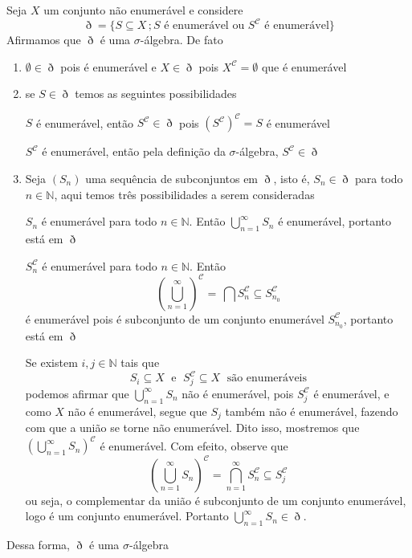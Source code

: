 \documentclass[a4paper, 11pt]{book}
\theoremstyle{definition}
\newcommand{\bN}{\mathbb{N}}
\newcommand{\cC}{\mathcal{C}}
\begin{document}
\begin{ex}
    Seja $X$ um conjunto não enumerável e considere
    \[
        \eth = \{ S \subseteq X \,; \text{$S$ é enumerável ou $S^{\mathcal{C}}$ é enumerável} \}
    \]
    Afirmamos que $\eth$ é uma $\sigma$-álgebra. De fato
    \begin{enumerate}[leftmargin=*]
        \item $\emptyset \in \eth$ pois é enumerável e $X \in \eth$ pois $X^\cC = \emptyset$ que é enumerável

        \item se $S \in \eth$ temos as seguintes possibilidades

        $S$ é enumerável, então $S^\cC \in \eth$ pois $(S^\cC)^\cC = S$ é enumerável

        $S^\cC$ é enumerável, então pela definição da $\sigma$-álgebra, $S^\cC \in \eth$

        \item Seja $(S_n)$ uma sequência de subconjuntos em $\eth$, isto é, $S_n \in \eth$ para todo $n \in \bN$, aqui temos três possibilidades a serem consideradas
        
        $S_n$ é enumerável para todo $n \in \bN$. Então $\bigcup_{n=1}^\infty S_n$ é enumerável, portanto está em $\eth$

        $S_n^\cC$ é enumerável para todo $n \in \bN$. Então
        \[
            \left( \bigcup_{n=1}^\infty \right)^\cC \!\! = \, \bigcap S_n^\cC \subseteq S_{n_0}^\cC
        \]
        é enumerável pois é subconjunto de um conjunto enumerável $S_{n_0}^\cC$, portanto está em $\eth$

        Se existem $i,j \in \bN$ tais que
        \[
            S_i \subseteq X \;\text{ e }\; S_j^\cC \subseteq X \;\text{ são enumeráveis}
        \]
        podemos afirmar que $\bigcup_{n=1}^\infty S_n$ não é enumerável, pois $S_j^\cC$ é enumerável, e como $X$ não é enumerável, segue que $S_j$ também não é enumerável, fazendo com que a união se torne não enumerável. Dito isso, mostremos que $ \left( \bigcup_{n=1}^\infty S_n \right)^\cC$ é enumerável. Com efeito, observe que
        \[
            \left( \bigcup_{n=1}^\infty S_n \right)^\cC = \bigcap_{n=1}^\infty S_n^\cC \subseteq S_j^\cC
        \]
        ou seja, o complementar da união é subconjunto de um conjunto enumerável, logo é um conjunto enumerável. Portanto $\bigcup_{n=1}^\infty S_n \in \eth$.
    \end{enumerate}
    Dessa forma, $\eth$ é uma $\sigma$-álgebra
\end{ex}
\end{document}
